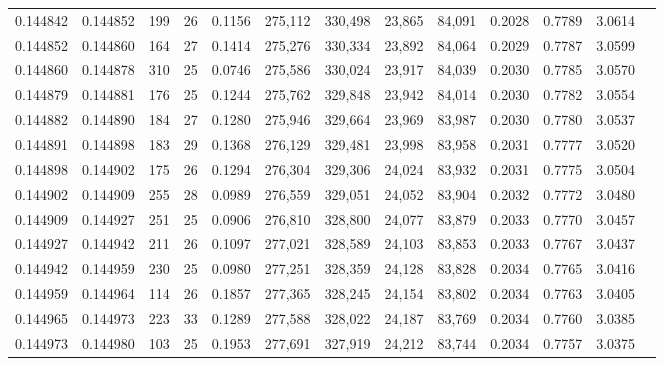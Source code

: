\begin{tabular}{rrrrrrrrrrrrr}
0.144842 & 0.144852 & 199 &  26 &                                     0.1156 & 275,112 & 330,498 &  23,865 &  84,091 & 0.2028 & 0.7789 & 3.0614 \\
0.144852 & 0.144860 & 164 &  27 &                                     0.1414 & 275,276 & 330,334 &  23,892 &  84,064 & 0.2029 & 0.7787 & 3.0599 \\
0.144860 & 0.144878 & 310 &  25 &                                     0.0746 & 275,586 & 330,024 &  23,917 &  84,039 & 0.2030 & 0.7785 & 3.0570 \\
0.144879 & 0.144881 & 176 &  25 &                                     0.1244 & 275,762 & 329,848 &  23,942 &  84,014 & 0.2030 & 0.7782 & 3.0554 \\
0.144882 & 0.144890 & 184 &  27 &                                     0.1280 & 275,946 & 329,664 &  23,969 &  83,987 & 0.2030 & 0.7780 & 3.0537 \\
0.144891 & 0.144898 & 183 &  29 &                                     0.1368 & 276,129 & 329,481 &  23,998 &  83,958 & 0.2031 & 0.7777 & 3.0520 \\
0.144898 & 0.144902 & 175 &  26 &                                     0.1294 & 276,304 & 329,306 &  24,024 &  83,932 & 0.2031 & 0.7775 & 3.0504 \\
0.144902 & 0.144909 & 255 &  28 &                                     0.0989 & 276,559 & 329,051 &  24,052 &  83,904 & 0.2032 & 0.7772 & 3.0480 \\
0.144909 & 0.144927 & 251 &  25 &                                     0.0906 & 276,810 & 328,800 &  24,077 &  83,879 & 0.2033 & 0.7770 & 3.0457 \\
0.144927 & 0.144942 & 211 &  26 &                                     0.1097 & 277,021 & 328,589 &  24,103 &  83,853 & 0.2033 & 0.7767 & 3.0437 \\
0.144942 & 0.144959 & 230 &  25 &                                     0.0980 & 277,251 & 328,359 &  24,128 &  83,828 & 0.2034 & 0.7765 & 3.0416 \\
0.144959 & 0.144964 & 114 &  26 &                                     0.1857 & 277,365 & 328,245 &  24,154 &  83,802 & 0.2034 & 0.7763 & 3.0405 \\
0.144965 & 0.144973 & 223 &  33 &                                     0.1289 & 277,588 & 328,022 &  24,187 &  83,769 & 0.2034 & 0.7760 & 3.0385 \\
0.144973 & 0.144980 & 103 &  25 &                                     0.1953 & 277,691 & 327,919 &  24,212 &  83,744 & 0.2034 & 0.7757 & 3.0375 \\

\end{tabular}
